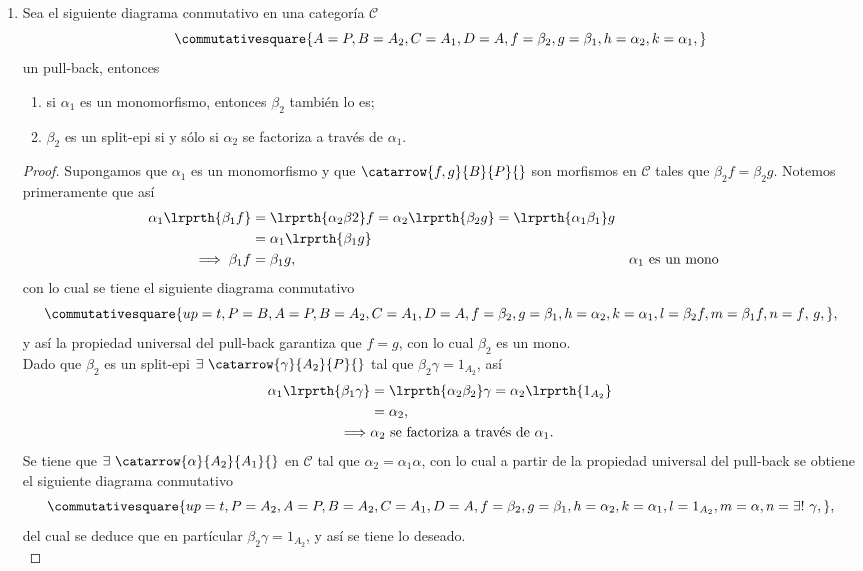 \documentclass{article}
\begin{document}
\begin{enumerate}[label=\textbf{Ej \arabic*.}]
\begin{proof}
		\end{proof} 
		\item Sea el siguiente diagrama conmutativo en una categoría $\mathscr{C}$
		\begin{equation*}
			\commutativesquare{A=P,B=A_2,C=A_1,D=A,f=\beta_2,g=\beta_1,h=\alpha_2,k=\alpha_1,}
		\end{equation*}
		un pull-back, entonces
		\begin{enumerate}
			\item si $\alpha_1$ es un monomorfismo, entonces $\beta_2$ también lo es;
			\item $\beta_2$ es un split-epi si y sólo si $\alpha_2$ se factoriza a través de $\alpha_1$.
		\end{enumerate}
		\begin{proof}
			 Supongamos que $\alpha_1$ es un monomorfismo y que $\catarrow{f,g}{B}{P}{}$ son morfismos en $\mathscr{C}$ tales que $\beta_2 f=\beta_2 g$. Notemos primeramente que así
			\begin{align*}
				\alpha_1\lrprth{\beta_1 f}&=\lrprth{\alpha_2\beta 2}f=\alpha_2\lrprth{\beta_2 g}=\lrprth{\alpha_1\beta_1}g\\
				&=\alpha_1\lrprth{\beta_1 g}\\
				\implies \beta_1 f&=\beta_1 g, && \alpha_1\text{ es un mono}
			\end{align*}
			con lo cual se tiene el siguiente diagrama conmutativo
			\begin{equation*}
				\commutativesquare{up=t,P=B,A=P,B=A_2,C=A_1,D=A,f=\beta_2,g=\beta_1,h=\alpha_2,k=\alpha_1,l=\beta_2 f,m=\beta_1 f,n=f\text{, }g,},
			\end{equation*}
		y así la propiedad universal del pull-back garantiza que $f=g$, con lo cual $\beta_2$ es un mono.\\
		 Dado que $\beta_2$ es un split-epi $\exists\ \catarrow{\gamma}{A_2}{P}{}$ tal que $\beta_2\gamma=1_{A_2}$, así
		\begin{align*}
			\alpha_1\lrprth{\beta_1\gamma}&=\lrprth{\alpha_2\beta_2}\gamma=\alpha_2\lrprth{1_{A_2}}\\
			&=\alpha_2,\\
			\implies &\alpha_2\text{ se factoriza a través de }\alpha_1.
		\end{align*}
		 Se tiene que $\exists\ \catarrow{\alpha}{A_2}{A_1}{}$ en $\mathscr{C}$ tal que $\alpha_2=\alpha_1\alpha$, con lo cual a partir de la propiedad universal del pull-back se obtiene el siguiente diagrama conmutativo
		\begin{equation*}
			\commutativesquare{up=t, P=A_2, A=P,B=A_2,C=A_1,D=A,f=\beta_2,g=\beta_1,h=\alpha_2,k=\alpha_1, l=1_{A_2},m=\alpha,n=\exists !\ \gamma,},
		\end{equation*}
		del cual se deduce que en partícular $\beta_2\gamma=1_{A_2}$, y así se tiene lo deseado.\\
		\end{proof}


\end{enumerate}
\end{document}

